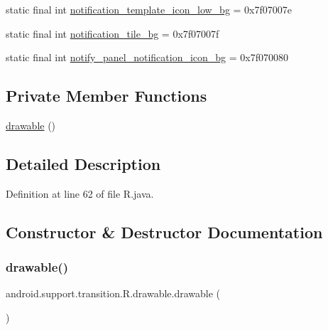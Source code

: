 \begin{DoxyCompactItemize}
\item 
static final int \mbox{\hyperlink{classandroid_1_1support_1_1transition_1_1_r_1_1drawable_abdcffad9445d9236028d811f06e030f4}{notification\+\_\+template\+\_\+icon\+\_\+low\+\_\+bg}} = 0x7f07007e
\item 
static final int \mbox{\hyperlink{classandroid_1_1support_1_1transition_1_1_r_1_1drawable_ad920be4f2a571fceddc972f834706a4d}{notification\+\_\+tile\+\_\+bg}} = 0x7f07007f
\item 
static final int \mbox{\hyperlink{classandroid_1_1support_1_1transition_1_1_r_1_1drawable_a092035eb15baba9b662d4715dcf6e2f4}{notify\+\_\+panel\+\_\+notification\+\_\+icon\+\_\+bg}} = 0x7f070080
\end{DoxyCompactItemize}
\subsection*{Private Member Functions}
\begin{DoxyCompactItemize}
\item 
\mbox{\hyperlink{classandroid_1_1support_1_1transition_1_1_r_1_1drawable_a1658051e9ec2598c21b98c43166f9f4e}{drawable}} ()
\end{DoxyCompactItemize}


\subsection{Detailed Description}


Definition at line 62 of file R.\+java.



\subsection{Constructor \& Destructor Documentation}
\mbox{\label{classandroid_1_1support_1_1transition_1_1_r_1_1drawable_a1658051e9ec2598c21b98c43166f9f4e}} 
\subsubsection{\texorpdfstring{drawable()}{drawable()}}
{\footnotesize\ttfamily android.\+support.\+transition.\+R.\+drawable.\+drawable (\begin{DoxyParamCaption}{ }\end{DoxyParamCaption})\hspace{0.3cm}{\ttfamily [private]}}



